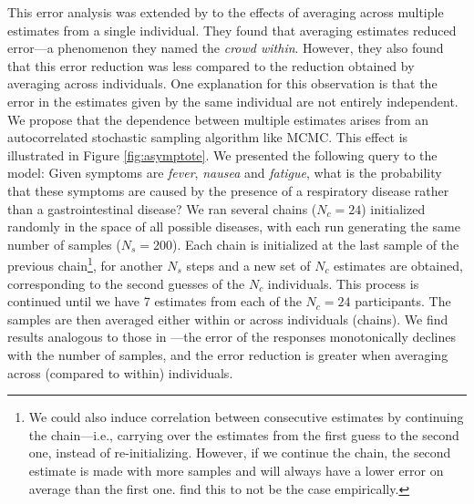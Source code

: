 This error analysis was extended by \citet{vul08} to the effects of averaging across multiple estimates from a single individual. They found that averaging estimates reduced error---a phenomenon they named the \emph{crowd within}. However, they also found that this error reduction was less compared to the reduction obtained by averaging across individuals. One explanation for this observation is that the error in the estimates given by the same individual are not entirely independent. We propose that the dependence between multiple estimates arises from an autocorrelated stochastic sampling algorithm like MCMC. 
This effect is illustrated in Figure \ref{fig:asymptote}. We presented the following query to the model: Given symptoms are \emph{fever}, \emph{nausea} and \emph{fatigue}, what is the probability that these symptoms are caused by the presence of a respiratory disease rather than a gastrointestinal disease? We ran several chains ($N_c = 24$) initialized randomly in the space of all possible diseases, with each run generating the same number of samples ($N_s = 200$). Each chain is initialized at the last sample of the previous chain\footnote{We could also induce correlation between consecutive estimates by continuing the chain---i.e., carrying over the estimates from the first guess to the second one, instead of re-initializing. However, if we continue the chain, the second estimate is made with more samples and will always have a lower error on average than the first one. \citet{vul08} find this to not be the case empirically.}, for another $N_s$ steps and a new set of $N_c$ estimates are obtained, corresponding to the second guesses of the $N_c$ individuals. This process is continued until we have 7 estimates from each of the $N_c = 24$ participants. The samples are then averaged either within or across individuals (chains). We find results analogous to those in \citet{vul08}---the error of the responses monotonically declines with the number of samples, and the error reduction is greater when averaging across (compared to within) individuals.

